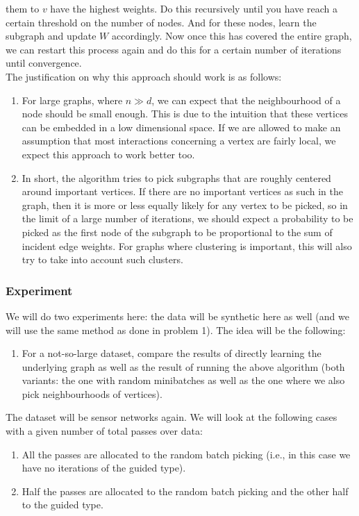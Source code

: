 \documentclass[a4paper]{article}
\newcommand{\nl}{\vspace{0.2cm}\\}
\begin{document}
them to $v$ have the highest weights. Do this recursively until you have reach a certain threshold on the number of nodes. And for these nodes, learn the subgraph and update $W$ accordingly. Now
once this has covered the entire graph, we can restart this process again and do this for a certain number of iterations until convergence.\nl
The justification on why this approach should work is as follows:
\begin{enumerate}
    \item For large graphs, where $n \gg d$, we can expect that the neighbourhood of a node should be small enough. This is due to the intuition that these vertices can be embedded in a low
        dimensional space. If we are allowed to make an assumption that most interactions concerning a vertex are fairly local, we expect this approach to work better too.
    \item In short, the algorithm tries to pick subgraphs that are roughly centered around important vertices. If there are no important vertices as such in the graph, then it is more or less equally
        likely for any vertex to be picked, so in the limit of a large number of iterations, we should expect a probability to be picked as the first node of the subgraph to be proportional
        to the sum of incident edge weights. For graphs where clustering is important, this will also try to take into account such clusters.
\end{enumerate}

\subsubsection{Experiment}

We will do two experiments here: the data will be synthetic here as well (and we will use the same method as done in problem 1). The idea will be the following:
\begin{enumerate}
    \item For a not-so-large dataset, compare the results of directly learning the underlying graph as well as the result of running the above algorithm (both variants: the one with random
        minibatches as well as the one where we also pick neighbourhoods of vertices).
\end{enumerate}

The dataset will be sensor networks again. We will look at the following cases with a given number of total passes over data:

\begin{enumerate}
    \item All the passes are allocated to the random batch picking (i.e., in this case we have no iterations of the guided type).
    \item Half the passes are allocated to the random batch picking and the other half to the guided type.
\end{enumerate}
\end{document}
